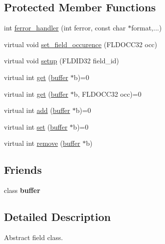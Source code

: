 \subsection*{Protected Member Functions}
\begin{DoxyCompactItemize}
\item 
int \hyperlink{classatmi_1_1field_a82f2929ff88ac1cf6d5d1fb7b93736d6}{ferror\+\_\+handler} (int ferror, const char $\ast$format,...)
\item 
virtual void \hyperlink{classatmi_1_1field_a83412cd9df383c342b5feb195090c9d9}{set\+\_\+field\+\_\+occurence} (F\+L\+D\+O\+C\+C32 occ)
\item 
virtual void \hyperlink{classatmi_1_1field_a9ca5e61e3e1068770098d20ad1332f24}{setup} (F\+L\+D\+I\+D32 field\+\_\+id)
\item 
virtual int \hyperlink{classatmi_1_1field_af6c42d9410250936fa4e69854375a3fc}{get} (\hyperlink{classatmi_1_1buffer}{buffer} $\ast$b)=0
\item 
virtual int \hyperlink{classatmi_1_1field_ae3fcad0a671dd56e370a992850b40454}{get} (\hyperlink{classatmi_1_1buffer}{buffer} $\ast$b, F\+L\+D\+O\+C\+C32 occ)=0
\item 
virtual int \hyperlink{classatmi_1_1field_af8a3477256b0f22313493d9435193442}{add} (\hyperlink{classatmi_1_1buffer}{buffer} $\ast$b)=0
\item 
virtual int \hyperlink{classatmi_1_1field_a0153530cc98a94cbb5c6e85d1ced52fb}{set} (\hyperlink{classatmi_1_1buffer}{buffer} $\ast$b)=0
\item 
virtual int \hyperlink{classatmi_1_1field_acc64bbe29ab57e08ac9a24c0713c67b7}{remove} (\hyperlink{classatmi_1_1buffer}{buffer} $\ast$b)
\end{DoxyCompactItemize}
\subsection*{Friends}
\begin{DoxyCompactItemize}
\item 
\hypertarget{classatmi_1_1field_afecbc2840248040e50fecb7164f912a9}{}class {\bfseries buffer}\label{classatmi_1_1field_afecbc2840248040e50fecb7164f912a9}

\end{DoxyCompactItemize}


\subsection{Detailed Description}
Abstract field class.

